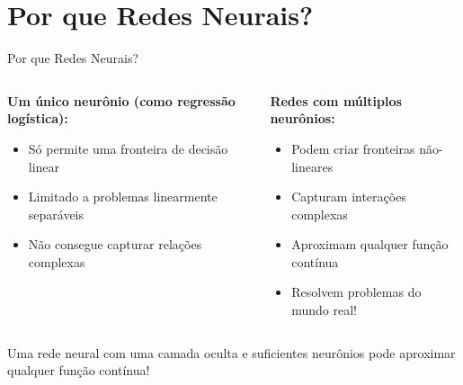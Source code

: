 \documentclass[xcolor=dvipsnames,t,aspectratio=169]{beamer}
\newcommand{\highlight}[1]{{\color{nes_dark_orange} #1}}
\begin{document}
\section{Por que Redes Neurais?}
\begin{frame}[c]{Por que Redes Neurais?}
    \begin{columns}[c]
        \begin{column}{0.5\textwidth}
            \textbf{Um único neurônio (como regressão logística):}
            \begin{itemize}
                \item Só permite uma \highlight{fronteira de decisão linear}
                \item Limitado a problemas linearmente separáveis
                \item Não consegue capturar relações complexas
            \end{itemize}
        \end{column}
        \begin{column}{0.5\textwidth}
            \textbf{Redes com múltiplos neurônios:}
            \begin{itemize}
                \item Podem criar \highlight{fronteiras não-lineares}
                \item Capturam interações complexas
                \item Aproximam qualquer função contínua
                \item Resolvem problemas do mundo real!
            \end{itemize}
        \end{column}
    \end{columns}
    
    \vspace{0.5cm}
    
    \begin{attention}
        Uma rede neural com uma camada oculta e suficientes neurônios pode aproximar qualquer função contínua!
    \end{attention}
\end{frame}
\end{document}
